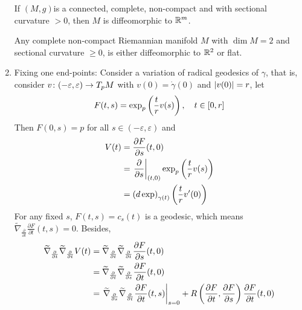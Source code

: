 \begin{enumerate}[label=\Roman{*}.]
	\begin{thm}
		If $(M,g)$is a connected, complete, non-compact and with sectional curvature $> 0$, then $M$ is diffeomorphic to $\mathbb{R}^m$.
	\end{thm}
	\begin{rmk}
		Any complete non-compact Riemannian manifold $M$ with $\dim M = 2$ and sectional curvature $\geq 0$, is either diffeomorphic to $\mathbb{R}^2$ or flat.
	\end{rmk}

	\item Fixing one end-points: Consider a variation of radical geodesics of $\gamma$, that is, consider $v \colon (-\varepsilon,\varepsilon) \rightarrow T_pM$ with $v(0) = \dot{\gamma}(0)$ and $\left\lvert v(0)\right\lvert = r$, let
	\begin{equation*}
		F(t,s) = \exp_p\left(\frac{t}{r}v(s)\right),\quad t\in [0,r]
	\end{equation*}
	Then $F(0,s) = p$ for all $s \in (-\varepsilon,\varepsilon)$ and 
	\begin{equation*}
		\begin{aligned}
		 	V(t) &= \frac{\partial F}{\partial s}(t,0) \\
		 	&= \left.\frac{\partial }{\partial s}\right\lvert_{(t,0)}\exp_p\left(\frac{t}{r}v(s)\right) \\
		 	&= \left(d\exp\right)_{\gamma(t)}\left(\frac{t}{r}v^\prime(0)\right)
		\end{aligned} 
	\end{equation*}
	For any fixed $s$, $F(t,s) = c_s(t)$ is a geodesic, which means $\widetilde{\nabla}_{\frac{\partial}{\partial t}} \frac{\partial F}{\partial t}(t,s) = 0$. Besides,
	\begin{equation*}
		\begin{aligned}
			\widetilde{\nabla}_{\frac{\partial}{\partial t}}\widetilde{\nabla}_{\frac{\partial}{\partial t}} V(t) &= \widetilde{\nabla}_{\frac{\partial}{\partial t}}\widetilde{\nabla}_{\frac{\partial}{\partial t}} \frac{\partial F}{\partial s}(t,0) \\
			&= \widetilde{\nabla}_{\frac{\partial}{\partial t}}\widetilde{\nabla}_{\frac{\partial}{\partial s}} \frac{\partial F}{\partial t}(t,0) \\
			&= \lv{\widetilde{\nabla}_{\frac{\partial}{\partial s}}\widetilde{\nabla}_{\frac{\partial}{\partial t}} \frac{\partial F}{\partial t}(t,s)}_{s=0} +  R\bc{\frac{\partial F}{\partial t},\frac{\partial F}{\partial s}}\frac{\partial F}{\partial t}(t,0)\\
		\end{aligned}

\end{equation*}
\end{enumerate}
